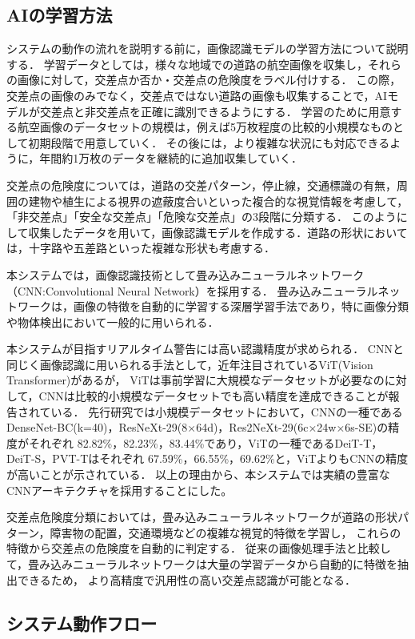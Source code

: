 \documentclass[uplatex,dvipdfmx]{jsarticle}
\begin{document}
\subsection{AIの学習方法}
システムの動作の流れを説明する前に，画像認識モデルの学習方法について説明する．
学習データとしては，様々な地域での道路の航空画像を収集し，それらの画像に対して，交差点か否か・交差点の危険度をラベル付けする．
この際，交差点の画像のみでなく，交差点ではない道路の画像も収集することで，AIモデルが交差点と非交差点を正確に識別できるようにする．
学習のために用意する航空画像のデータセットの規模は，例えば5万枚程度の比較的小規模なものとして初期段階で用意していく．
その後には，より複雑な状況にも対応できるように，年間約1万枚のデータを継続的に追加収集していく．

交差点の危険度については，道路の交差パターン，停止線，交通標識の有無，周囲の建物や植生による視界の遮蔽度合いといった複合的な視覚情報を考慮して，「非交差点」「安全な交差点」「危険な交差点」の3段階に分類する．
このようにして収集したデータを用いて，画像認識モデルを作成する．道路の形状においては，十字路や五差路といった複雑な形状も考慮する．

本システムでは，画像認識技術として畳み込みニューラルネットワーク（CNN:Convolutional Neural Network）を採用する．
畳み込みニューラルネットワークは，画像の特徴を自動的に学習する深層学習手法であり，特に画像分類や物体検出において一般的に用いられる\cite{ref:newral}．

本システムが目指すリアルタイム警告には高い認識精度が求められる．
CNNと同じく画像認識に用いられる手法として，近年注目されているViT(Vision Transformer)があるが，
ViTは事前学習に大規模なデータセットが必要なのに対して，CNNは比較的小規模なデータセットでも高い精度を達成できることが報告されている．
先行研究では小規模データセットにおいて，CNNの一種であるDenseNet-BC(k=40)，ResNeXt-29(8×64d)，Res2NeXt-29(6c×24w×6s-SE)の精度がそれぞれ
82.82\%，82.23\%，83.44\%であり，ViTの一種であるDeiT-T，DeiT-S，PVT-Tはそれぞれ
67.59\%，66.55\%，69.62\%と，ViTよりもCNNの精度が高いことが示されている\cite{ref:cnn_vit}．
以上の理由から、本システムでは実績の豊富なCNNアーキテクチャを採用することにした。

交差点危険度分類においては，畳み込みニューラルネットワークが道路の形状パターン，障害物の配置，交通環境などの複雑な視覚的特徴を学習し，
これらの特徴から交差点の危険度を自動的に判定する．
従来の画像処理手法と比較して，畳み込みニューラルネットワークは大量の学習データから自動的に特徴を抽出できるため，
より高精度で汎用性の高い交差点認識が可能となる．

\subsection{システム動作フロー}
\end{document}
